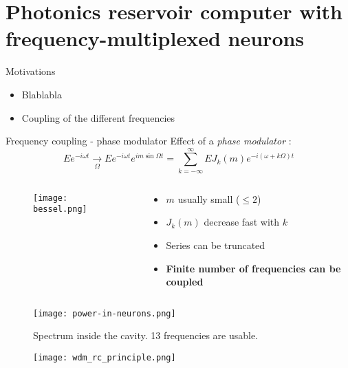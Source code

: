 \section[Photonics RC with frequency-multiplexed neurons]{Photonics reservoir computer with frequency-multiplexed neurons}

\begin{frame}{Motivations}
	\begin{itemize}
		\item Blablabla
		\item Coupling of the different frequencies
	\end{itemize}
\end{frame}

\begin{frame}[allowframebreaks]{Frequency coupling - phase modulator}
	Effect of a \emph{phase modulator} :
	\begin{equation}
		Ee^{-i\omega t} \underset{\Omega}{\rightarrow} Ee^{-i\omega t}e^{im\sin{\Omega t}}= \sum_{k=-\infty}^{\infty} E J_k(m) e^{-i(\omega+k\Omega)t}
	\end{equation}
	
	
	\begin{columns}
	\begin{column}{.5\textwidth}
		\begin{figure}
		\texttt{[image: bessel.png]}
		\end{figure}

	\end{column}
	\begin{column}{.48\textwidth}
			\begin{itemize}
			\item $m$ usually small ($\leq 2$)
			\item $J_k (m)$ decrease fast with $k$
			\item Series can be truncated
			\item \textbf{Finite number of frequencies can be coupled}
		\end{itemize}
	\end{column}%
	\hfill
	\end{columns}
	
	\begin{figure}
		\texttt{[image: power-in-neurons.png]}
		\caption{Spectrum inside the cavity. 13 frequencies are usable.\cite{AkroutAkram2016Pprc}}
	\end{figure}
	
\end{frame}


\begin{frame}
	\begin{figure}
		\texttt{[image: wdm\_rc\_principle.png]}
		\caption{\cite{AkroutAkram2016Pprc}}
	\end{figure}
	
\end{frame}
